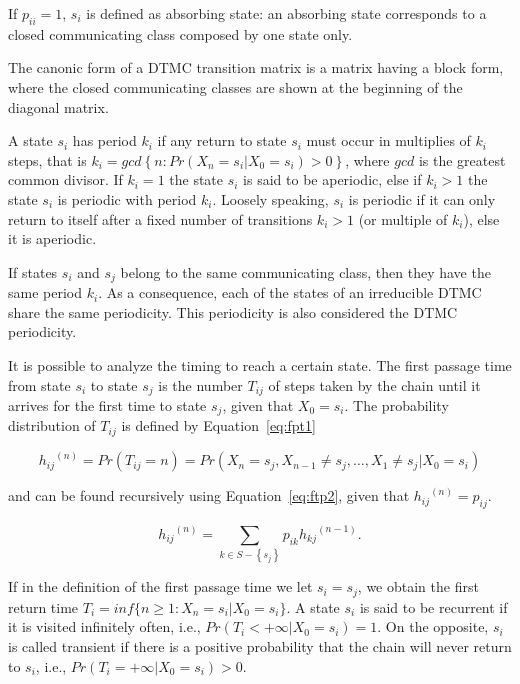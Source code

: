 \documentclass[nojss]{jss}
\begin{document}
If $p_{ii}=1$, $s_{i}$ is defined as absorbing
state: an absorbing state corresponds to a closed communicating class composed by one state only.

The canonic form of a DTMC transition matrix is a matrix having a
block form, where the closed communicating classes are shown at the beginning of the diagonal matrix.

A state $s_{i}$ has period $k_{i}$ if any return to state $s_{i}$
must occur in multiplies of $k_{i}$ steps, that is $k_{i}=gcd\left\{ n:Pr\left(X_{n}=s_{i}\left|X_{0}=s_{i}\right.\right)>0\right\}$, where
$gcd$ is the greatest common divisor. If $k_{i}=1$ the state $s_{i}$ is said
to be aperiodic, else if $k_{i}>1$ the state $s_{i}$ is periodic with period $k_{i}$. Loosely speaking, $s_{i}$  is periodic if it can only return to itself after a fixed number of transitions $k_{i}>1$ (or multiple of $k_{i}$), else it is aperiodic. 

If states $s_{i}$ and $s_{j}$ belong to the same communicating class, then they have the same period $k_{i}$. As a consequence, each of the states of an irreducible DTMC share the same periodicity. This periodicity is also considered the DTMC periodicity.

It is possible to analyze the timing to reach a certain state. The first passage time from state $s_{i}$ to state $s_{j}$ is the number $T_{ij}$ of steps taken by the chain until it arrives for the first time to state $s_{j}$, given that $X_{0} = s_{i}$. The probability distribution of $T_{ij}$ is defined by Equation~\ref{eq:fpt1}

\begin{equation}
{h_{ij}}^{\left( n \right)} = Pr\left( {{T_{ij}} = n} \right) = Pr\left( {{X_n} = s_{j},{X_{n - 1}} \ne s_{j}, \ldots ,{X_1} \ne s_{j}|{X_0} = s_{i}} \right)
\label{eq:fpt1}
\end{equation}

and can be found recursively using Equation~\ref{eq:ftp2}, given that ${h_{ij}}^{\left( n \right)} = p_{ij}$.

\begin{equation}
{h_{ij}}^{\left( n \right)} = \sum\limits_{k \in S - \left\{ s_{j} \right\}}^{} {{p_{ik}}{h_{kj}}^{\left( {n - 1} \right)}}.
\label{eq:ftp2}
\end{equation}

If in the definition of the first passage time we let $s_{i}=s_{j}$, we obtain the first return time $T_{i}=inf \{ n\geq1:X_{n}=s_{i}|X_{0}=s_{i} \}$. A state $s_{i}$ is said to be recurrent if it is visited infinitely often, i.e., $Pr(T_{i}<+\infty|X_{0}=s_{i})=1$. On the opposite, $s_{i}$ is called transient if there is a positive probability that the chain will never return to $s_{i}$, i.e., $Pr(T_{i}=+\infty|X_{0}=s_{i})>0$. 
\end{document}
